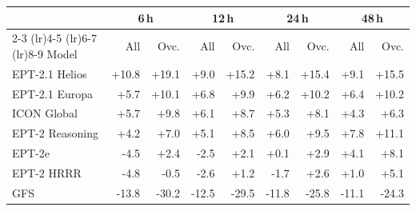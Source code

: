 \begin{tabular}{@{}l*{8}{r}@{}}
\toprule
& \multicolumn{2}{c}{6\,h} & \multicolumn{2}{c}{12\,h} & \multicolumn{2}{c}{24\,h} & \multicolumn{2}{c}{48\,h} \\
\cmidrule(lr){2-3} \cmidrule(lr){4-5} \cmidrule(lr){6-7} \cmidrule(lr){8-9}
Model & All & Ovc. & All & Ovc. & All & Ovc. & All & Ovc. \\
\midrule
EPT-2.1 Helios & +10.8 & +19.1 & +9.0 & +15.2 & +8.1 & +15.4 & +9.1 & +15.5 \\\addlinespace[0.3em]
EPT-2.1 Europa & +5.7 & +10.1 & +6.8 & +9.9 & +6.2 & +10.2 & +6.4 & +10.2 \\\addlinespace[0.3em]
ICON Global & +5.7 & +9.8 & +6.1 & +8.7 & +5.3 & +8.1 & +4.3 & +6.3 \\\addlinespace[0.3em]
EPT-2 Reasoning & +4.2 & +7.0 & +5.1 & +8.5 & +6.0 & +9.5 & +7.8 & +11.1 \\\addlinespace[0.3em]
EPT-2e & -4.5 & +2.4 & -2.5 & +2.1 & +0.1 & +2.9 & +4.1 & +8.1 \\\addlinespace[0.3em]
EPT-2 HRRR & -4.8 & -0.5 & -2.6 & +1.2 & -1.7 & +2.6 & +1.0 & +5.1 \\\addlinespace[0.3em]
GFS & -13.8 & -30.2 & -12.5 & -29.5 & -11.8 & -25.8 & -11.1 & -24.3 \\
\bottomrule
\end{tabular}
